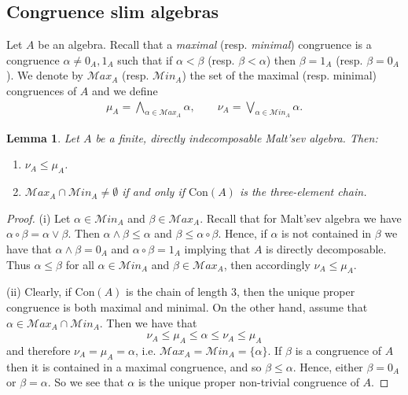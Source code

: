 \documentclass[a4paper, english, 9pt]{amsart}
\theoremstyle{plain}
\newtheorem{lemma}[theorem]{Lemma}
\theoremstyle{definition}
\def\con{\mathrm{Con}}
\def\Ma{\mathcal Max}
\def\ma{\mathcal Min}
\begin{document}
\subsection{Congruence slim algebras}\label{slim}

Let $A$ be an algebra. Recall that a {\it maximal} (resp. {\it minimal}) congruence is a congruence $\alpha\neq 0_A,1_A$ such that if $\alpha< \beta$ (resp. $\beta<\alpha$) then $\beta=1_A$ (resp. $\beta=0_A$). We denote by $\Ma_A$ (resp. $\ma_A$) the set of the maximal (resp. minimal) congruences of $A$ and we define 
\begin{align*}
\mu_A =\bigwedge_{\alpha\in \Ma_A} \alpha, \qquad
\nu_A =\bigvee_{\alpha\in \ma_A} \alpha.
\end{align*}



\begin{lemma}\label{cong of directly irred}
Let $A$ be a finite, directly indecomposable Malt'sev algebra. Then: 
\begin{enumerate}
    \item[(i)] $\nu_A\leq \mu_A$. 
    \item[(ii)] $\Ma_A\cap \ma_A\neq \emptyset$ if and only if $\con(A)$ is the three-element chain.
\end{enumerate}

\end{lemma}

\begin{proof}
(i) Let $\alpha\in \ma_A$ and $\beta\in \Ma_A$. Recall that for Malt'sev algebra we have $\alpha\circ \beta=\alpha\vee\beta$. Then $\alpha\wedge\beta\leq \alpha$ and $\beta\leq\alpha\circ \beta$. Hence, if $\alpha$ is not contained in $\beta$ we have that $\alpha\wedge\beta=0_A$ and $\alpha\circ\beta=1_A$ implying that $A$ is directly decomposable. Thus $\alpha\leq \beta$ for all $\alpha\in \ma_A$ and $\beta\in \Ma_A$, then accordingly $\nu_A\leq\mu_A$. 

(ii) Clearly, if $\con(A)$ is the chain of length $3$, then the unique proper congruence is both maximal and minimal. On the other hand, assume that $\alpha\in \Ma_A\cap \ma_A$. Then we have that
$$\nu_A\leq \mu_A\leq \alpha\leq \nu_A\leq \mu_A$$
and therefore $\nu_A= \mu_A=\alpha$, i.e. $\Ma_A=\ma_A=\{\alpha\}$. If $\beta$ is a congruence of $A$ then it is contained in a maximal congruence, and so $\beta\leq \alpha$. Hence, either $\beta=0_A$ or $\beta=\alpha$. So we see that $\alpha$ is the unique proper non-trivial congruence of $A$. 
%
%
\end{proof}
\end{document}

